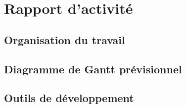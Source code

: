 \section{Rapport d'activité}

\subsection{Organisation du travail}


\subsection{Diagramme de Gantt prévisionnel}


\subsection{Outils de développement}



